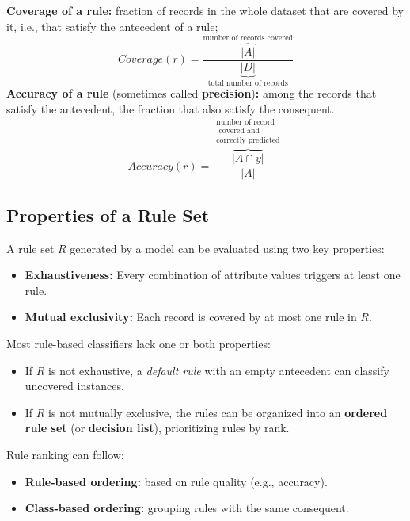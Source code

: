 \begin{definition}
\textbf{Coverage of a rule:} fraction of records in the whole dataset that are covered by it, i.e., that satisfy the antecedent of a rule;
\begin{equation}
Coverage(r) = \frac{\overbrace{|A|}^{\text{number of records covered}}}{\underbrace{|D|}_{\text{total number of records}}} 
\end{equation}
\textbf{Accuracy of a rule} (sometimes called \textbf{precision})\textbf{:} among the records that satisfy the antecedent, the fraction that also satisfy the consequent.
\begin{equation}
    Accuracy(r) = \frac{\overbrace{|A \cap y|}^{\substack{\text{number of record}\\\text{ covered and} \\\text{correctly predicted}}}}{|A|}
\end{equation}
\end{definition}
\subsection{Properties of a Rule Set}

A rule set $R$ generated by a model can be evaluated using two key properties:
\begin{itemize}
    \item \textbf{Exhaustiveness:} Every combination of attribute values triggers at least one rule.
    \item \textbf{Mutual exclusivity:} Each record is covered by at most one rule in $R$.
\end{itemize}

Most rule-based classifiers lack one or both properties:
\begin{itemize}
    \item If $R$ is not exhaustive, a \textit{default rule} with an empty antecedent can classify uncovered instances.
    \item If $R$ is not mutually exclusive, the rules can be organized into an \textbf{ordered rule set} (or \textbf{decision list}), prioritizing rules by rank.
\end{itemize}

Rule ranking can follow:
\begin{itemize}
    \item \textbf{Rule-based ordering:} based on rule quality (e.g., accuracy).
    \item \textbf{Class-based ordering:} grouping rules with the same consequent.
\end{itemize}

